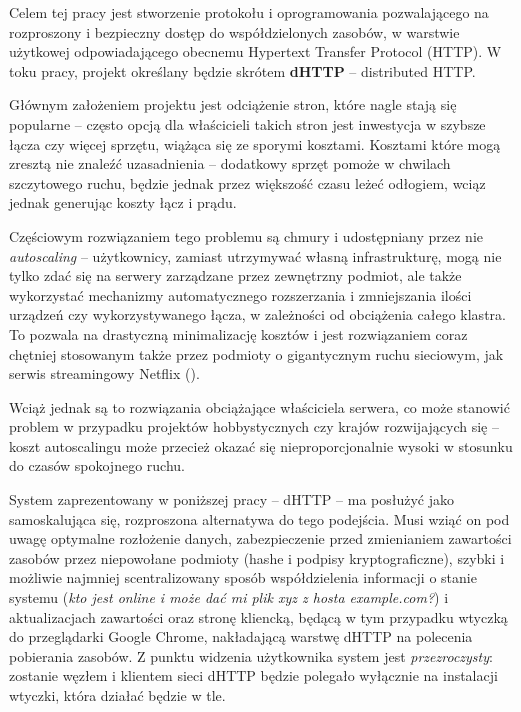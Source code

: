 
Celem tej pracy jest stworzenie protokołu i oprogramowania pozwalającego na rozproszony i bezpieczny dostęp do współdzielonych zasobów, w warstwie użytkowej odpowiadającego obecnemu Hypertext Transfer Protocol (HTTP). W toku pracy, projekt określany będzie skrótem \textbf{dHTTP} -- distributed HTTP.

Głównym założeniem projektu jest odciążenie stron, które nagle stają się popularne -- często opcją dla właścicieli takich stron jest inwestycja w szybsze łącza czy więcej sprzętu, wiążąca się ze sporymi kosztami. Kosztami które mogą zresztą nie znaleźć uzasadnienia -- dodatkowy sprzęt pomoże w chwilach szczytowego ruchu, będzie jednak przez większość czasu leżeć odłogiem, wciąz jednak generując koszty łącz i prądu.


Częściowym rozwiązaniem tego problemu są chmury i udostępniany przez nie {\em autoscaling} -- użytkownicy, zamiast utrzymywać własną infrastrukturę, mogą nie tylko zdać się na serwery zarządzane przez zewnętrzny podmiot, ale także wykorzystać mechanizmy automatycznego rozszerzania i zmniejszania ilości urządzeń czy wykorzystywanego łącza, w zależności od obciążenia całego klastra. To pozwala na drastyczną minimalizację kosztów i jest rozwiązaniem coraz chętniej stosowanym także przez podmioty o gigantycznym ruchu sieciowym, jak serwis streamingowy Netflix (\cite{AWSAs}).

Wciąż jednak są to rozwiązania obciążające właściciela serwera, co może stanowić problem w przypadku projektów hobbystycznych czy krajów rozwijających się -- koszt autoscalingu może przecież okazać się nieproporcjonalnie wysoki w stosunku do czasów spokojnego ruchu.

System zaprezentowany w poniższej pracy -- dHTTP -- ma posłużyć jako samoskalująca się, rozproszona alternatywa do tego podejścia. Musi wziąć on pod uwagę optymalne rozłożenie danych, zabezpieczenie przed zmienianiem zawartości zasobów przez niepowołane podmioty (hashe i podpisy kryptograficzne), szybki i możliwie najmniej scentralizowany sposób współdzielenia informacji o stanie systemu ({\em kto jest online i może dać mi plik xyz z hosta example.com?}) i aktualizacjach zawartości oraz stronę kliencką, będącą w tym przypadku wtyczką do przeglądarki Google Chrome, nakładającą warstwę dHTTP na polecenia pobierania zasobów. Z punktu widzenia użytkownika system jest {\em przezroczysty}: zostanie  węzłem i klientem sieci dHTTP będzie polegało wyłącznie na instalacji wtyczki, która działać będzie w tle.